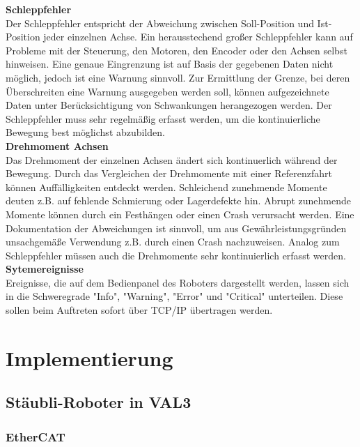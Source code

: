 \documentclass[ a4paper,
                oneside,
                toc=bibliography,
                toc=listof
                ]{scrbook}
\begin{document}
 	\textbf{Schleppfehler}\\
 	Der Schleppfehler entspricht der Abweichung zwischen Soll-Position und Ist-Position jeder einzelnen Achse. Ein herausstechend großer Schleppfehler kann auf Probleme mit der Steuerung, den Motoren, den Encoder oder den Achsen selbst hinweisen. Eine genaue Eingrenzung ist auf Basis der gegebenen Daten nicht möglich, jedoch ist eine Warnung sinnvoll. Zur Ermittlung der Grenze, bei deren Überschreiten eine Warnung ausgegeben werden soll, können aufgezeichnete Daten unter Berücksichtigung von Schwankungen herangezogen werden. Der Schleppfehler muss sehr regelmäßig erfasst werden, um die kontinuierliche Bewegung best möglichst abzubilden.\\
 	\textbf{Drehmoment Achsen}\\
 	Das Drehmoment der einzelnen Achsen ändert sich kontinuerlich während der Bewegung. Durch das Vergleichen der Drehmomente mit einer Referenzfahrt können  Auffälligkeiten entdeckt werden. Schleichend zunehmende Momente deuten z.B. auf fehlende Schmierung oder Lagerdefekte hin. Abrupt zunehmende Momente können durch ein Festhängen oder einen Crash verursacht werden. Eine Dokumentation der Abweichungen ist sinnvoll, um aus Gewährleistungsgründen unsachgemäße Verwendung z.B. durch einen Crash nachzuweisen. Analog zum Schleppfehler müssen auch die Drehmomente sehr kontinuierlich erfasst werden.\\
	\textbf{Sytemereignisse}\\
	Ereignisse, die auf dem Bedienpanel des Roboters dargestellt werden, lassen sich in die Schweregrade "Info", "Warning", "Error" und "Critical" unterteilen. Diese sollen beim Auftreten sofort über TCP/IP übertragen werden.
	\newpage
	\chapter{Implementierung}
	
	\section{Stäubli-Roboter in VAL3}
	
	\subsection{EtherCAT}
	
\end{document}
